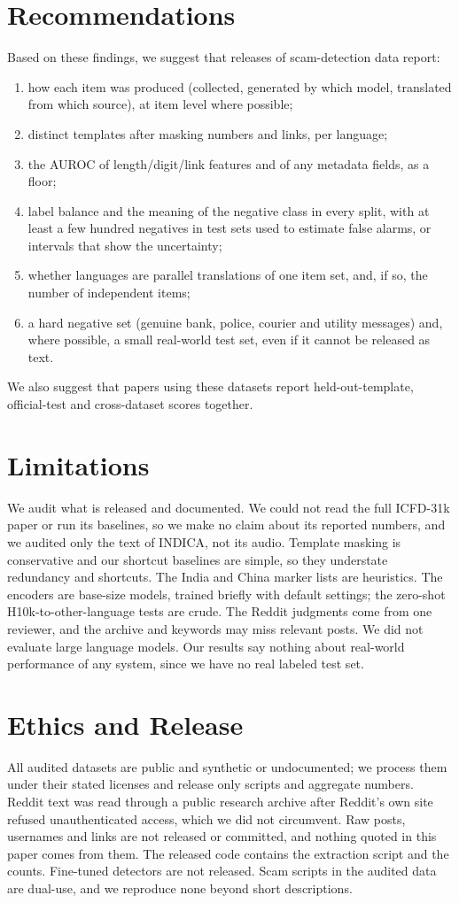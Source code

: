 \documentclass[conference]{IEEEtran}
\begin{document}
\section{Recommendations}
Based on these findings, we suggest that releases of scam-detection data report:
\begin{enumerate}
\item how each item was produced (collected, generated by which model, translated from which source), at item level where possible;
\item distinct templates after masking numbers and links, per language;
\item the AUROC of length/digit/link features and of any metadata fields, as a floor;
\item label balance and the meaning of the negative class in every split, with at least a few hundred negatives in test sets used to estimate false alarms, or intervals that show the uncertainty;
\item whether languages are parallel translations of one item set, and, if so, the number of independent items;
\item a hard negative set (genuine bank, police, courier and utility messages) and, where possible, a small real-world test set, even if it cannot be released as text.
\end{enumerate}
We also suggest that papers using these datasets report held-out-template, official-test and cross-dataset scores together.

\section{Limitations}
We audit what is released and documented. We could not read the full ICFD-31k paper or run its baselines, so we make no claim about its reported numbers, and we audited only the text of INDICA, not its audio. Template masking is conservative and our shortcut baselines are simple, so they understate redundancy and shortcuts. The India and China marker lists are heuristics. The encoders are base-size models, trained briefly with default settings; the zero-shot H10k-to-other-language tests are crude. The Reddit judgments come from one reviewer, and the archive and keywords may miss relevant posts. We did not evaluate large language models. Our results say nothing about real-world performance of any system, since we have no real labeled test set.

\section{Ethics and Release}
\label{sec:ethics}
All audited datasets are public and synthetic or undocumented; we process them under their stated licenses and release only scripts and aggregate numbers. Reddit text was read through a public research archive after Reddit's own site refused unauthenticated access, which we did not circumvent. Raw posts, usernames and links are not released or committed, and nothing quoted in this paper comes from them. The released code contains the extraction script and the counts. Fine-tuned detectors are not released. Scam scripts in the audited data are dual-use, and we reproduce none beyond short descriptions.
\end{document}
